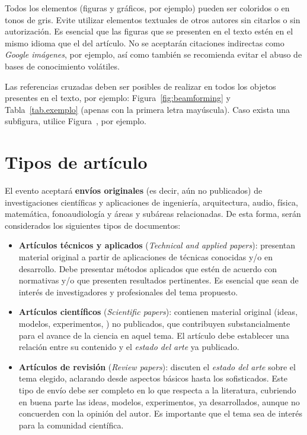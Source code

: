 \documentclass[12pt, a4paper, twoside, twocolumn]{article}
\begin{document}
Todos los elementos (figuras y gráficos, por ejemplo) pueden ser coloridos o en tonos de gris. Evite utilizar elementos textuales de otros autores sin citarlos o sin autorización. Es esencial que las figuras que se presenten en el texto estén en el mismo idioma que el del artículo. No se aceptarán citaciones indirectas como \textit{Google imágenes}, por ejemplo, así como también se recomienda evitar el abuso de bases de conocimiento volátiles.

Las referencias cruzadas deben ser posibles de realizar en todos los objetos presentes en el texto, por ejemplo: Figura~\ref{fig:beamforming} y Tabla~\ref{tab.exemplo} (apenas con la primera letra mayúscula). Caso exista una subfigura, utilice Figura~, por ejemplo.


\section{Tipos de artículo}

El evento aceptará \textbf{envíos originales} (es decir, aún no publicados) de investigaciones científicas y aplicaciones de ingeniería, arquitectura, audio, física, matemática, fonoaudiología y áreas y subáreas relacionadas. De esta forma, serán considerados los siguientes tipos de documentos:
%
\begin{itemize}[noitemsep,topsep=2ex] \itemsep=12pt
	\item \textbf{Artículos técnicos y aplicados} (\textit{Technical and applied papers}): presentan material original a partir de aplicaciones de técnicas conocidas y/o en desarrollo. Debe presentar métodos aplicados que estén de acuerdo con normativas y/o que presenten resultados pertinentes. Es esencial que sean de interés de investigadores y profesionales del tema propuesto.
	
	\item \textbf{Artículos científicos} (\textit{Scientific papers}): 
	contienen material original (ideas, modelos, experimentos, \etc) no publicados, que contribuyen substancialmente para el avance de la ciencia en aquel tema. El artículo debe establecer una relación entre su contenido y el \textit{estado del arte} ya publicado.

	\item \textbf{Artículos de revisión} (\textit{Review papers}):
	discuten el \textit{estado del arte} sobre el tema elegido, aclarando desde aspectos básicos hasta los sofisticados. Este tipo de envío debe ser completo en lo que respecta a la literatura, cubriendo en buena parte las ideas, modelos, experimentos, \etc ya desarrollados, aunque no concuerden con la opinión del autor. Es importante que el tema sea de interés para la comunidad científica.
\end{itemize}
\end{document}
